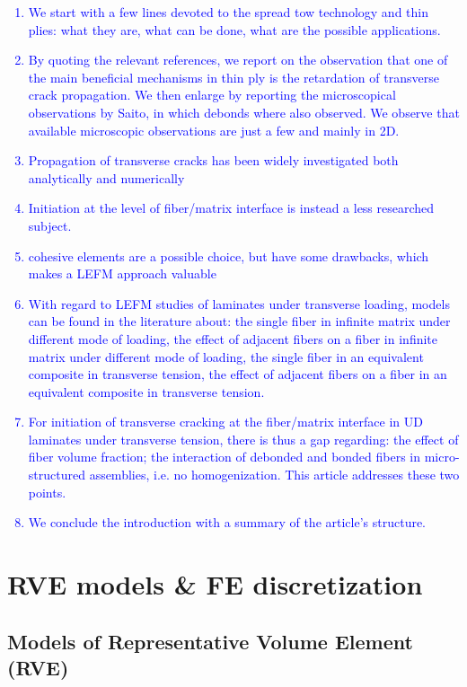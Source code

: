\documentclass[review]{elsarticle}
\begin{document}
\textcolor{blue}{
\begin{enumerate}
\item We start with a few lines devoted to the spread tow technology and thin plies: what they are, what can be done, what are the possible applications.
\item By quoting the relevant references, we report on the observation that one of the main beneficial mechanisms in thin ply is the retardation of transverse crack propagation. We then enlarge by reporting the microscopical observations by Saito, in which debonds where also observed. We observe that available microscopic observations are just a few and mainly in 2D.
\item Propagation of transverse cracks has been widely investigated both analytically and numerically
\item Initiation at the level of fiber/matrix interface is instead a less researched subject.
\item cohesive elements are a possible choice, but have some drawbacks, which makes a LEFM approach valuable
\item With regard to LEFM studies of laminates under transverse loading, models can be found in the literature about: the single fiber in infinite matrix under different mode of loading, the effect of adjacent fibers on a fiber in infinite matrix under different mode of loading, the single fiber in an equivalent composite in transverse tension, the effect of adjacent fibers on a fiber in an equivalent composite in transverse tension.
\item For initiation of transverse cracking at the fiber/matrix interface in UD laminates under transverse tension, there is thus a gap regarding: the effect of fiber volume fraction; the interaction of debonded and bonded fibers in micro-structured assemblies, i.e. no homogenization. This article addresses these two points.
\item We conclude the introduction with a summary of the article's structure.
\end{enumerate}
}

\section{RVE models \& FE discretization}

\subsection{Models of Representative Volume Element (RVE)}\label{subsec:rve}
\end{document}
